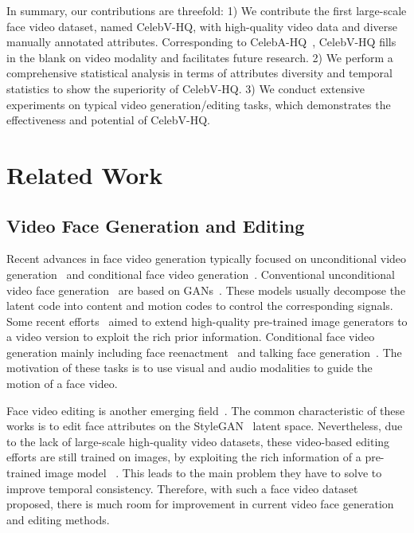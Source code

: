 \documentclass[runningheads]{llncs}
\begin{document}
In summary, our contributions are threefold:
1) We contribute the first large-scale face video dataset, named CelebV-HQ, with high-quality video data and diverse manually annotated attributes. Corresponding to CelebA-HQ~\cite{celebahq}, CelebV-HQ fills in the blank on video modality and facilitates future research.
2) We perform a comprehensive statistical analysis in terms of attributes diversity and temporal statistics to show the superiority of CelebV-HQ.
3) We conduct extensive experiments on typical video generation/editing tasks, which demonstrates the effectiveness and potential of CelebV-HQ.



\section{Related Work}

\subsection{Video Face Generation and Editing}
\begin{sloppypar}
    

Recent advances in face video generation typically focused on unconditional video generation~\cite{vgan,tgan,mocogan,digan,mocoganhd,styleganv} and conditional face video generation~\cite{wayne2018reenactgan,fomm,bilayermodel,wang2021facevid2vid,zhou2019talking,chen2019hierarchical,zhu2021arbitrary,zhou2021pose,ji2021audio}. 
Conventional unconditional video face generation~\cite{vgan,tgan,mocogan,digan} are based on GANs~\cite{gan}. These models usually decompose the latent code into content and motion codes to control the corresponding signals. 
Some recent efforts~\cite{mocoganhd,styleganv} aimed to extend high-quality pre-trained image generators to a video version to exploit the rich prior information. Conditional face video generation mainly including face reenactment~\cite{wayne2018reenactgan,fomm,bilayermodel,wang2021facevid2vid} and talking face generation~\cite{zhou2019talking,chen2019hierarchical,zhu2021arbitrary,zhou2021pose,ji2021audio}. The motivation of these tasks is to use visual and audio modalities to guide the motion of a face video.
\end{sloppypar}

Face video editing is another emerging field~\cite{yao2021latent,tzaban2022stitch}. 
The common characteristic of these works is to edit face attributes on the StyleGAN~\cite{stylegan2} latent space. 
Nevertheless, due to the lack of large-scale high-quality video datasets, these video-based editing efforts are still trained on images, by exploiting the rich information of a pre-trained image model ~\cite{stylegan2}. This leads to the main problem they have to solve to improve temporal consistency.
Therefore, with such a face video dataset proposed, there is much room for improvement in current video face generation and editing methods.
\end{document}

